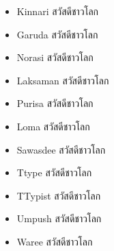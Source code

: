 \documentclass{article}
\begin{document}
\begin{itemize}
  \item {} \selectfont Kinnari สวัสดีชาวโลก
  \item {} \selectfont Garuda สวัสดีชาวโลก
  \item {} \selectfont Norasi สวัสดีชาวโลก
  \item {} \selectfont Laksaman สวัสดีชาวโลก
  \item {} \selectfont Purisa สวัสดีชาวโลก
  \item {} \selectfont Loma สวัสดีชาวโลก
  \item {} \selectfont Sawasdee สวัสดีชาวโลก
  \item {} \selectfont Ttype สวัสดีชาวโลก
  \item {} \selectfont TTypist สวัสดีชาวโลก
  \item {} \selectfont Umpush สวัสดีชาวโลก
  \item {} \selectfont Waree สวัสดีชาวโลก
\end{itemize}
\end{document}
